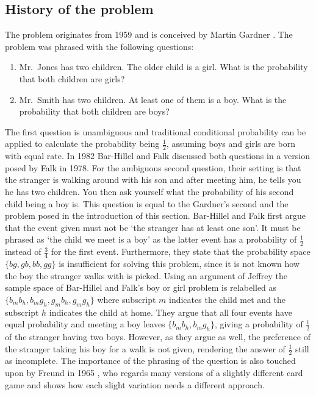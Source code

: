 \documentclass[a4paper]{report}
\theoremstyle{plain}
\theoremstyle{definition}
\theoremstyle{remark}
\numberwithin{equation}{chapter}
\DeclareMathOperator{\1}{\mathbbm{1}}
\begin{document}
\subsection{History of the problem}
The problem originates from 1959 and is conceived by Martin Gardner \cite{WikiChildren}. The problem was phrased with the following questions:
\begin{enumerate}
	\item Mr.~Jones has two children. The older child is a girl. What is the probability that both children are girls?
	\item Mr.~Smith has two children. At least one of them is a boy. What is the probability that both children are boys?
\end{enumerate}
The first question is unambiguous and traditional conditional probability can be applied to calculate the probability being $\frac{1}{2}$, assuming boys and girls are born with equal rate. In 1982 Bar-Hillel and Falk \cite{BarHillel82} discussed both questions in a version posed by Falk in 1978. For the ambiguous second question, their setting is that the stranger is walking around with his son and after meeting him, he tells you he has two children. You then ask yourself what the probability of his second child being a boy is. This question is equal to the Gardner's second and the problem posed in the introduction of this section. Bar-Hillel and Falk first argue that the event given must not be `the stranger has at least one son'. It must be phrased as `the child we meet is a boy' as the latter event has a probability of $\frac{1}{2}$ instead of $\frac{3}{4}$ for the first event. Furthermore, they state that the probability space $\{bg,gb,bb,gg\}$ is insufficient for solving this problem, since it is not known how the boy the stranger walks with is picked. Using an argument of Jeffrey \cite{Jeffrey68} the sample space of Bar-Hillel and Falk's boy or girl problem is relabelled as $\{b_mb_h,b_mg_h,g_mb_h,g_mg_h\}$ where subscript $m$ indicates the child met and the subscript $h$ indicates the child at home. They argue that all four events have equal probability and meeting a boy leaves $\{b_mb_h,b_mg_h\}$, giving a probability of $\frac{1}{2}$ of the stranger having two boys. However, as they argue as well, the preference of the stranger taking his boy for a walk is not given, rendering the answer of $\frac{1}{2}$ still as incomplete. The importance of the phrasing of the question is also touched upon by Freund in 1965 \cite{Freund65}, who regards many versions of a slightly different card game and shows how each slight variation needs a different approach.
\end{document}
